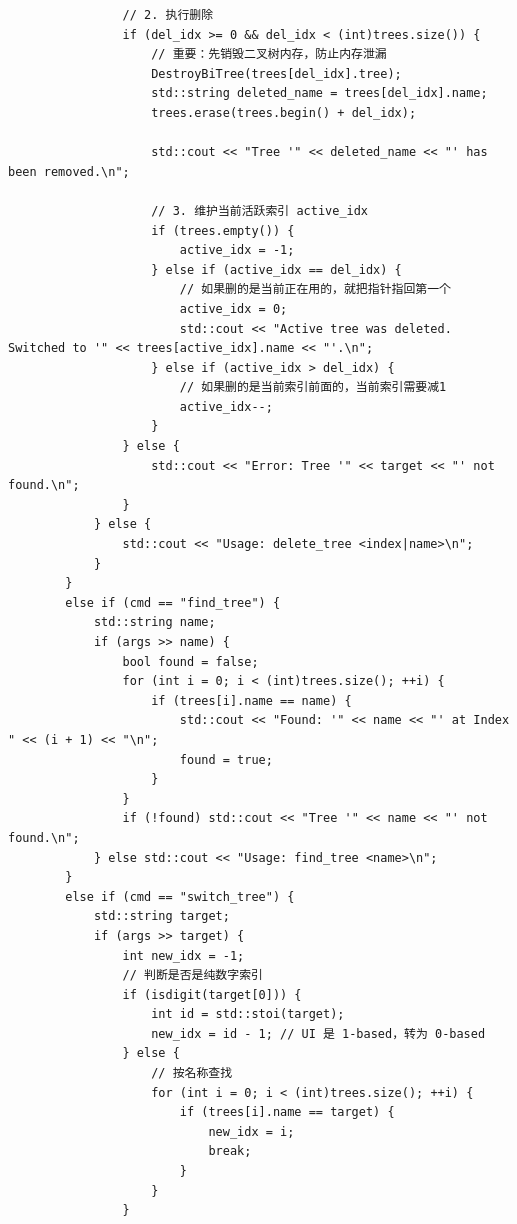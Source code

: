 \documentclass[supercite]{Experimental_Report}
\theoremstyle{definition}
\begin{document}
\begin{lstlisting}
				// 2. 执行删除
				if (del_idx >= 0 && del_idx < (int)trees.size()) {
					// 重要：先销毁二叉树内存，防止内存泄漏
					DestroyBiTree(trees[del_idx].tree);
					std::string deleted_name = trees[del_idx].name;
					trees.erase(trees.begin() + del_idx);
					
					std::cout << "Tree '" << deleted_name << "' has been removed.\n";
					
					// 3. 维护当前活跃索引 active_idx
					if (trees.empty()) {
						active_idx = -1;
					} else if (active_idx == del_idx) {
						// 如果删的是当前正在用的，就把指针指回第一个
						active_idx = 0;
						std::cout << "Active tree was deleted. Switched to '" << trees[active_idx].name << "'.\n";
					} else if (active_idx > del_idx) {
						// 如果删的是当前索引前面的，当前索引需要减1
						active_idx--;
					}
				} else {
					std::cout << "Error: Tree '" << target << "' not found.\n";
				}
			} else {
				std::cout << "Usage: delete_tree <index|name>\n";
			}
		}
		else if (cmd == "find_tree") {
			std::string name;
			if (args >> name) {
				bool found = false;
				for (int i = 0; i < (int)trees.size(); ++i) {
					if (trees[i].name == name) {
						std::cout << "Found: '" << name << "' at Index " << (i + 1) << "\n";
						found = true;
					}
				}
				if (!found) std::cout << "Tree '" << name << "' not found.\n";
			} else std::cout << "Usage: find_tree <name>\n";
		}
		else if (cmd == "switch_tree") {
			std::string target;
			if (args >> target) {
				int new_idx = -1;
				// 判断是否是纯数字索引
				if (isdigit(target[0])) {
					int id = std::stoi(target);
					new_idx = id - 1; // UI 是 1-based，转为 0-based
				} else {
					// 按名称查找
					for (int i = 0; i < (int)trees.size(); ++i) {
						if (trees[i].name == target) {
							new_idx = i;
							break;
						}
					}
				}
				

\end{lstlisting}
\end{document}
